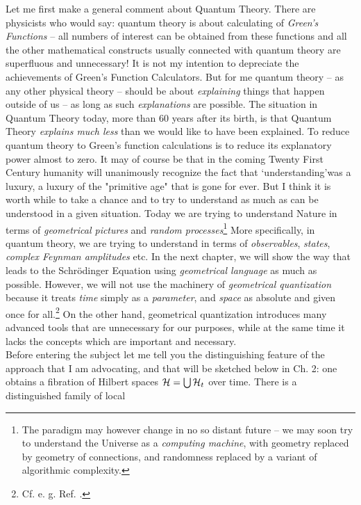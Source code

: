 \documentclass[12pt]{article}
\begin{document}
Let me first make a general comment about Quantum Theory.  There are
physicists who would say:  quantum theory is about calculating of {\sl 
Green's Functions} -- all numbers of interest can be obtained from these
functions and all the other mathematical constructs usually connected with 
quantum theory are
superfluous and unnecessary! It is not my intention to depreciate the 
achievements of Green's
Function Calculators.  But for me quantum theory -- 
as any other physical theory -- should be
about  {\sl explaining} things that happen outside of us -- as long as such {\sl 
explanations} are possible.  The situation in Quantum Theory today,  more than
60 years after its birth,  is that Quantum Theory {\sl explains much less}
than we would like to have been explained.
To reduce quantum theory to Green's
function calculations  is to reduce its explanatory power almost
to  zero.  
 It may of course be that in the coming 
  Twenty First  Century humanity will unanimously
recognize the fact that `understanding'\thinspace was a luxury,  a luxury of
the "primitive age" that is gone for ever.  But I think it is worth
while to take a chance and to try to  understand as much as can be
understood in a given situation.  Today we are trying to understand Nature
in terms of {\sl geometrical pictures} and
{\sl random processes}\footnote{The paradigm  may however change in no so
distant  future -- we may soon try to understand the Universe as a
{\sl computing machine},  with geometry replaced by geometry of
connections,  and randomness replaced by a variant of algorithmic
complexity. } More specifically,  in quantum theory,  we are trying to
understand in terms of {\sl observables},  {\sl states}, 
{\sl complex Feynman amplitudes}
etc.  In the next chapter,  we will show the way that leads to the
 Schr\"odinger Equation using
{\sl geometrical language} as much as possible.  However,  we will not use the
machinery of {\sl geometrical quantization} because it treats {\sl time}
simply as a {\sl parameter},  and {\sl space} as absolute and
given once for all.\footnote{Cf.  e. g.  Ref.  \cite[Ch. 9]{snia}. }
On the other hand,  geometrical quantization introduces many
advanced tools
that are unnecessary
for our purposes,  while at the same time it lacks the concepts which are
important and necessary. \\ 
Before entering the subject let me tell you the
distinguishing feature of the approach that I am advocating,  and that
will be sketched below in Ch. 
2:  one obtains a fibration of Hilbert spaces ${\cal H}=\bigcup {\cal H}
_t$ over time.  There is  a distinguished family of local
\end{document}
